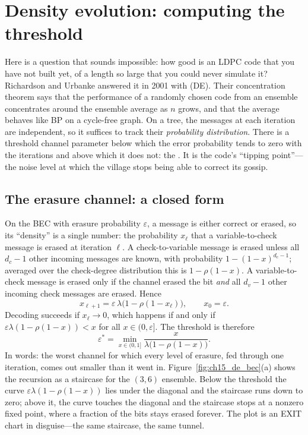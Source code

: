 \section{Density evolution: computing the threshold}
\label{sec:ch15:de}

Here is a question that sounds impossible: how good is an LDPC code that you have not built yet,
of a length so large that you could never simulate it? Richardson and Urbanke answered it in 2001
with  (DE). Their concentration theorem says that the performance of a
randomly chosen code from an ensemble concentrates around the ensemble average as $n$ grows, and
that the average behaves like BP on a cycle-free graph. On a tree, the messages at each iteration
are independent, so it suffices to track their \emph{probability distribution}. There is a
threshold channel parameter below which the error probability tends to zero with the iterations and
above which it does not: the . It is the code's ``tipping point''---the noise level
at which the village stops being able to correct its gossip.

\subsection{The erasure channel: a closed form}

On the BEC with erasure probability $\varepsilon$, a message is either correct or erased, so its
``density'' is a single number: the probability $x_\ell$ that a variable-to-check message is erased
at iteration $\ell$. A check-to-variable message is erased unless all $d_c-1$ other incoming messages
are known, with probability $1-(1-x)^{d_c-1}$; averaged over the check-degree distribution this is
$1-\rho(1-x)$. A variable-to-check message is erased only if the channel erased the bit \emph{and}
all $d_v-1$ other incoming check messages are erased. Hence
\begin{equation}
x_{\ell+1}=\varepsilon\,\lambda\big(1-\rho(1-x_\ell)\big),\qquad x_0=\varepsilon.
\label{eq:ch15:debec}
\end{equation}
Decoding succeeds if $x_\ell\to0$, which happens if and only if
$\varepsilon\lambda(1-\rho(1-x))<x$ for all $x\in(0,\varepsilon]$. The threshold is therefore
\begin{equation}
\varepsilon^*=\min_{x\in(0,1]}\frac{x}{\lambda\big(1-\rho(1-x)\big)}.
\label{eq:ch15:becthr}
\end{equation}
In words: the worst channel for which every level of erasure, fed through one iteration, comes out
smaller than it went in. Figure~\ref{fig:ch15_de_bec}(a) shows the recursion as a staircase for the
$(3,6)$ ensemble. Below the threshold the curve $\varepsilon\lambda(1-\rho(1-x))$ lies under the
diagonal and the staircase runs down to zero; above it, the curve touches the diagonal and the
staircase stops at a nonzero fixed point, where a fraction of the bits stays erased forever. The
plot is an EXIT chart in disguise---the same staircase, the same tunnel.

